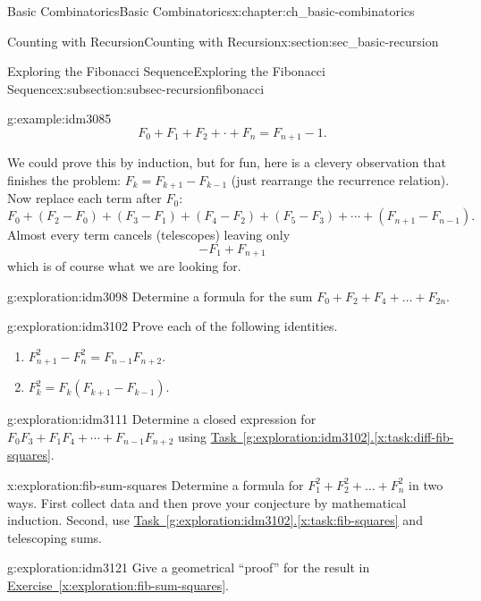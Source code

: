 \documentclass[oneside,10pt,]{book}
\numberwithin{equation}{chapter}
\begin{document}
\begin{chapterptx}{Basic Combinatorics}{}{Basic Combinatorics}{}{}{x:chapter:ch_basic-combinatorics}
\begin{sectionptx}{Counting with Recursion}{}{Counting with Recursion}{}{}{x:section:sec_basic-recursion}
\begin{subsectionptx}{Exploring the Fibonacci Sequence}{}{Exploring the Fibonacci Sequence}{}{}{x:subsection:subsec-recursionfibonacci}
\begin{example}{}{g:example:idm3085}
\begin{equation*}
F_0 + F_1 + F_2 + \cdot + F_n = F_{n+1} - 1.
\end{equation*}
%
\par
We could prove this by induction, but for fun, here is a clevery observation that finishes the problem: \(F_k = F_{k+1} - F_{k-1}\) (just rearrange the recurrence relation).  Now replace each term after \(F_0\):%
\begin{equation*}
F_0 + (F_2 - F_0) + (F_3 - F_1) + (F_4 - F_2) + (F_5 - F_3) + \cdots + (F_{n+1} - F_{n-1})\text{.}
\end{equation*}
Almost every term cancels (telescopes) leaving only%
\begin{equation*}
-F_1 + F_{n+1}
\end{equation*}
which is of course what we are looking for.%
\end{example}
\begin{exploration}{}{g:exploration:idm3098}%
Determine a formula for the sum  \(F_{0} + F_{2} + F_{4} + \ldots + F_{2n}\).%
\end{exploration}
\begin{exploration}{}{g:exploration:idm3102}%
Prove each of the following identities.%
\begin{enumerate}[font=\bfseries,label=(\alph*),ref=\alph*]
\item\label{x:task:diff-fib-squares}\(F_{n + 1}^{2} - F_{n}^{2} = F_{n - 1}F_{n + 2}\).%
\item\label{x:task:fib-squares}\(F_{k}^{2} = F_{k}(F_{k + 1} - F_{k - 1})\).%
\end{enumerate}
\end{exploration}
\begin{exploration}{}{g:exploration:idm3111}%
Determine a closed expression for \(F_{0}F_{3}
+ F_{1}F_{4} + \cdots +
F_{n-1}F_{n+2}\) using \hyperref[x:task:diff-fib-squares]{Task~\ref{g:exploration:idm3102}.\ref{x:task:diff-fib-squares}}.%
\end{exploration}
\begin{exploration}{}{x:exploration:fib-sum-squares}%
Determine a formula for \(F_{1}^{2} + F_{2}^{2} + \ldots + F_{n}^{2}\) in two ways.  First collect data and then prove your conjecture by mathematical induction.  Second, use \hyperref[x:task:fib-squares]{Task~\ref{g:exploration:idm3102}.\ref{x:task:fib-squares}} and telescoping sums.%
\end{exploration}
\begin{exploration}{}{g:exploration:idm3121}%
Give a geometrical ``proof'' for the result in \hyperref[x:exploration:fib-sum-squares]{Exercise~\ref{x:exploration:fib-sum-squares}}.%

\end{exploration}
\end{subsectionptx}
\end{sectionptx}
\end{chapterptx}
\end{document}
